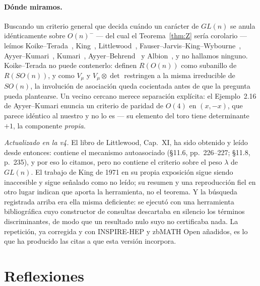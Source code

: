 \documentclass[11pt,a4paper]{article}
\begin{document}
\paragraph{Dónde miramos.} Buscando un criterio general que decida cuándo un carácter de
$GL(n)$ se anula idénticamente sobre $O(n)^-$ --- del cual el Teorema~\ref{thm:Z} sería
corolario --- leímos Koike--Terada~\cite{KoikeTerada}, King~\cite{King71b},
Littlewood~\cite{Littlewood58}, Fauser--Jarvis--King--Wybourne~\cite{FJKW},
Ayyer--Kumari~\cite{AyyerKumari}, Kumari~\cite{Kumari}, Ayyer--Behrend~\cite{AyyerBehrend} y
Albion~\cite{Albion}, y no hallamos ninguno. Koike--Terada no puede contenerlo: definen
$R(O(n))$ como subanillo de $R(SO(n))$, y como $V_\mu$ y $V_\mu\otimes\det$ restringen a la
misma irreducible de $SO(n)$, la involución de asociación queda cocientada antes de que la
pregunta pueda plantearse. Un vecino cercano merece separación explícita: el Ejemplo~2.16 de
Ayyer--Kumari enuncia un criterio de paridad de $O(4)$ en $(x,-x)$, que parece idéntico al
nuestro y no lo es --- su elemento del toro tiene determinante $+1$, la componente
\emph{propia}.

\emph{Actualizado en la v4.} El libro de Littlewood, Cap.~XI, ha sido obtenido y leído desde
entonces: contiene el mecanismo autoasociado (\S11.6, pp.~226--227; \S11.8, p.~235), y por eso
lo citamos, pero no contiene el criterio sobre el peso $\lambda$ de $GL(n)$. El trabajo de King
de 1971 en su propia exposición sigue siendo inaccesible y sigue señalado como no leído; su
resumen y una reproducción fiel en otro lugar indican que aporta la herramienta, no el teorema.
Y la búsqueda registrada arriba era ella misma deficiente: se ejecutó con una herramienta
bibliográfica cuyo constructor de consultas descartaba en silencio los términos discriminantes,
de modo que un resultado nulo suyo no certificaba nada. La repetición, ya corregida y con
INSPIRE-HEP y zbMATH Open añadidos, es lo que ha producido las citas a
\cite{DaviesMcLachlan1,DaviesMcLachlan2,Karmakar,AHMN23} que esta versión incorpora.

\section{Reflexiones}\label{sec:reflections}
\end{document}
